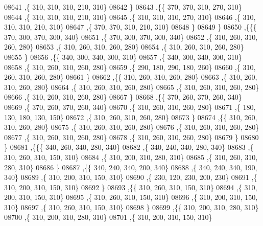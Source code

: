 \begin{DoxyCode}
08641     ,\{   310,   310,   310,   210,   310\}
08642     \}
08643    ,\{\{   370,   370,   310,   270,   310\}
08644     ,\{   310,   310,   310,   210,   310\}
08645     ,\{   310,   310,   310,   270,   310\}
08646     ,\{   310,   310,   310,   210,   310\}
08647     ,\{   370,   370,   310,   210,   310\}
08648     \}
08649    \}
08650   ,\{\{\{   370,   300,   370,   300,   340\}
08651     ,\{   370,   300,   370,   300,   340\}
08652     ,\{   310,   260,   310,   260,   280\}
08653     ,\{   310,   260,   310,   260,   280\}
08654     ,\{   310,   260,   310,   260,   280\}
08655     \}
08656    ,\{\{   340,   300,   340,   300,   310\}
08657     ,\{   340,   300,   340,   300,   310\}
08658     ,\{   310,   260,   310,   260,   280\}
08659     ,\{   290,   180,   290,   180,   260\}
08660     ,\{   310,   260,   310,   260,   280\}
08661     \}
08662    ,\{\{   310,   260,   310,   260,   280\}
08663     ,\{   310,   260,   310,   260,   280\}
08664     ,\{   310,   260,   310,   260,   280\}
08665     ,\{   310,   260,   310,   260,   280\}
08666     ,\{   310,   260,   310,   260,   280\}
08667     \}
08668    ,\{\{   370,   260,   370,   260,   340\}
08669     ,\{   370,   260,   370,   260,   340\}
08670     ,\{   310,   260,   310,   260,   280\}
08671     ,\{   180,   130,   180,   130,   150\}
08672     ,\{   310,   260,   310,   260,   280\}
08673     \}
08674    ,\{\{   310,   260,   310,   260,   280\}
08675     ,\{   310,   260,   310,   260,   280\}
08676     ,\{   310,   260,   310,   260,   280\}
08677     ,\{   310,   260,   310,   260,   280\}
08678     ,\{   310,   260,   310,   260,   280\}
08679     \}
08680    \}
08681   ,\{\{\{   340,   260,   340,   280,   340\}
08682     ,\{   340,   240,   340,   280,   340\}
08683     ,\{   310,   260,   310,   150,   310\}
08684     ,\{   310,   200,   310,   280,   310\}
08685     ,\{   310,   260,   310,   280,   310\}
08686     \}
08687    ,\{\{   340,   240,   340,   200,   340\}
08688     ,\{   340,   240,   340,   190,   340\}
08689     ,\{   310,   200,   310,   150,   310\}
08690     ,\{   230,   120,   230,   200,   230\}
08691     ,\{   310,   200,   310,   150,   310\}
08692     \}
08693    ,\{\{   310,   260,   310,   150,   310\}
08694     ,\{   310,   200,   310,   150,   310\}
08695     ,\{   310,   260,   310,   150,   310\}
08696     ,\{   310,   200,   310,   150,   310\}
08697     ,\{   310,   260,   310,   150,   310\}
08698     \}
08699    ,\{\{   310,   200,   310,   280,   310\}
08700     ,\{   310,   200,   310,   280,   310\}
08701     ,\{   310,   200,   310,   150,   310\}

\end{DoxyCode}
